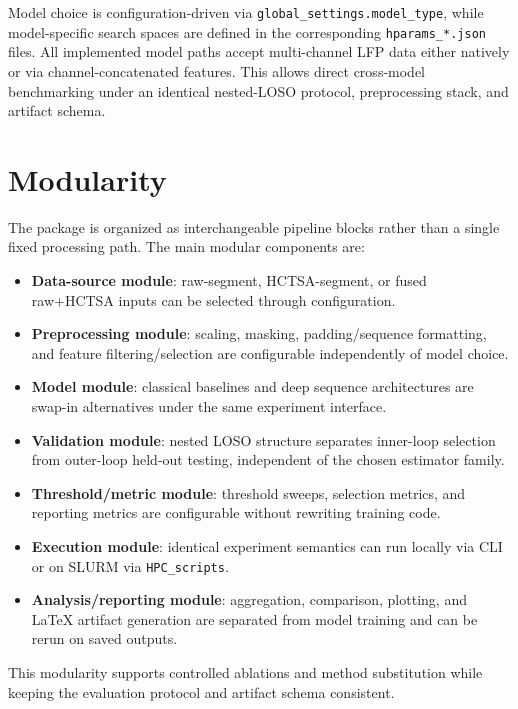 Model choice is configuration-driven via \texttt{global\_settings.model\_type}, while model-specific search spaces are defined in the corresponding \texttt{hparams\_*.json} files. All implemented model paths accept multi-channel LFP data either natively or via channel-concatenated features. This allows direct cross-model benchmarking under an identical nested-LOSO protocol, preprocessing stack, and artifact schema.

\section{Modularity}
\label{sec:reproducibility_modularity}
The package is organized as interchangeable pipeline blocks rather than a single fixed processing path. The main modular components are:
\begin{itemize}
\item \textbf{Data-source module}: raw-segment, HCTSA-segment, or fused raw+HCTSA inputs can be selected through configuration.
\item \textbf{Preprocessing module}: scaling, masking, padding/sequence formatting, and feature filtering/selection are configurable independently of model choice.
\item \textbf{Model module}: classical baselines and deep sequence architectures are swap-in alternatives under the same experiment interface.
\item \textbf{Validation module}: nested LOSO structure separates inner-loop selection from outer-loop held-out testing, independent of the chosen estimator family.
\item \textbf{Threshold/metric module}: threshold sweeps, selection metrics, and reporting metrics are configurable without rewriting training code.
\item \textbf{Execution module}: identical experiment semantics can run locally via CLI or on SLURM via \texttt{HPC\_scripts}.
\item \textbf{Analysis/reporting module}: aggregation, comparison, plotting, and LaTeX artifact generation are separated from model training and can be rerun on saved outputs.
\end{itemize}
This modularity supports controlled ablations and method substitution while keeping the evaluation protocol and artifact schema consistent.

